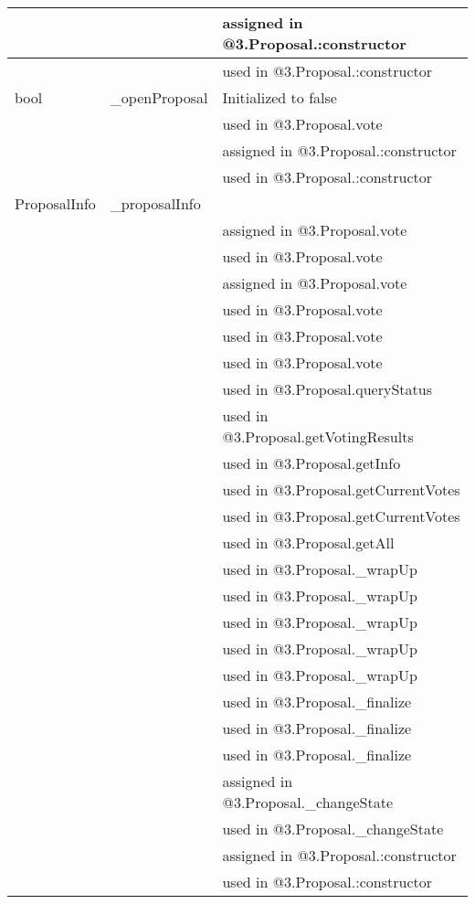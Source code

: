 \begin{tabular}{|l|l|p{5cm}|}
 & & assigned in @3.Proposal.:constructor\\\hline
 & & used in @3.Proposal.:constructor\\\hline
bool & \_{}openProposal & Initialized to false \\\hline
 & & used in @3.Proposal.vote\\\hline
 & & assigned in @3.Proposal.:constructor\\\hline
 & & used in @3.Proposal.:constructor\\\hline
ProposalInfo & \_{}proposalInfo &  \\\hline
 & & assigned in @3.Proposal.vote\\\hline
 & & used in @3.Proposal.vote\\\hline
 & & assigned in @3.Proposal.vote\\\hline
 & & used in @3.Proposal.vote\\\hline
 & & used in @3.Proposal.vote\\\hline
 & & used in @3.Proposal.vote\\\hline
 & & used in @3.Proposal.queryStatus\\\hline
 & & used in @3.Proposal.getVotingResults\\\hline
 & & used in @3.Proposal.getInfo\\\hline
 & & used in @3.Proposal.getCurrentVotes\\\hline
 & & used in @3.Proposal.getCurrentVotes\\\hline
 & & used in @3.Proposal.getAll\\\hline
 & & used in @3.Proposal.\_{}wrapUp\\\hline
 & & used in @3.Proposal.\_{}wrapUp\\\hline
 & & used in @3.Proposal.\_{}wrapUp\\\hline
 & & used in @3.Proposal.\_{}wrapUp\\\hline
 & & used in @3.Proposal.\_{}wrapUp\\\hline
 & & used in @3.Proposal.\_{}finalize\\\hline
 & & used in @3.Proposal.\_{}finalize\\\hline
 & & used in @3.Proposal.\_{}finalize\\\hline
 & & assigned in @3.Proposal.\_{}changeState\\\hline
 & & used in @3.Proposal.\_{}changeState\\\hline
 & & assigned in @3.Proposal.:constructor\\\hline
 & & used in @3.Proposal.:constructor\\\hline

\end{tabular}

